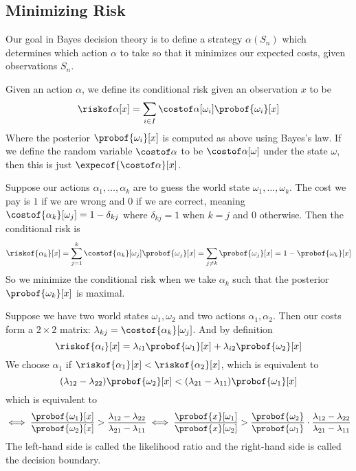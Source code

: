 \subsection{Minimizing Risk}

Our goal in Bayes decision theory is to define a strategy $\alpha(S_n)$ which determines which action $\alpha$ to take so that it minimizes our expected costs, given observations $S_n$.

\bdefn

    Given an action $\alpha$, we define its {\emphcolor conditional risk} given an observation $x$ to be
    $$ \riskof\alpha[x] = \sum_{i\in I}\costof\alpha[\omega_i]\probof{\omega_i}[x] $$
    Where the posterior $\probof{\omega_i}[x]$ is computed as above using Bayes's law.
    If we define the random variable $\costof\alpha$ to be $\costof\alpha[\omega]$ under the state $\omega$, then this is just $\expecof{\costof\alpha}[x]$.

\edefn

\bexam

    Suppose our actions $\alpha_1,\dots,\alpha_k$ are to guess the world state $\omega_1,\dots,\omega_k$.
    The cost we pay is $1$ if we are wrong and $0$ if we are correct, meaning $\costof{\alpha_k}[\omega_j]=1-\delta_{kj}$ where $\delta_{kj}=1$ when $k=j$ and $0$ otherwise.
    Then the conditional risk is
    $$ \riskof{\alpha_k}[x] = \sum_{j=1}^k\costof{\alpha_k}[\omega_j]\probof{\omega_j}[x] = \sum_{j\neq k}\probof{\omega_j}[x] = 1 - \probof{\omega_k}[x] $$
    So we minimize the conditional risk when we take $\alpha_k$ such that the posterior $\probof{\omega_k}[x]$ is maximal.

\eexam

\bexam

    Suppose we have two world states $\omega_1,\omega_2$ and two actions $\alpha_1,\alpha_2$.
    Then our costs form a $2\times2$ matrix: $\lambda_{kj}=\costof{\alpha_k}[\omega_j]$.
    And by definition
    $$ \riskof{\alpha_i}[x] = \lambda_{i1}\probof{\omega_1}[x] + \lambda_{i2}\probof{\omega_2}[x] $$
    We choose $\alpha_1$ if $\riskof{\alpha_1}[x]<\riskof{\alpha_2}[x]$, which is equivalent to
    $$ (\lambda_{12}-\lambda_{22})\probof{\omega_2}[x] < (\lambda_{21} - \lambda_{11})\probof{\omega_1}[x] $$
    which is equivalent to
    $$ \iff \frac{\probof{\omega_1}[x]}{\probof{\omega_2}[x]} > \frac{\lambda_{12}-\lambda_{22}}{\lambda_{21}-\lambda_{11}} \iff
    \frac{\probof{x}[\omega_1]}{\probof{x}[\omega_2]} > \frac{\probof{\omega_2}}{\probof{\omega_1}}\cdot\frac{\lambda_{12}-\lambda_{22}}{\lambda_{21}-\lambda_{11}} $$
    The left-hand side is called the {\emphcolor likelihood ratio} and the right-hand side is called the {\emphcolor decision boundary}.

